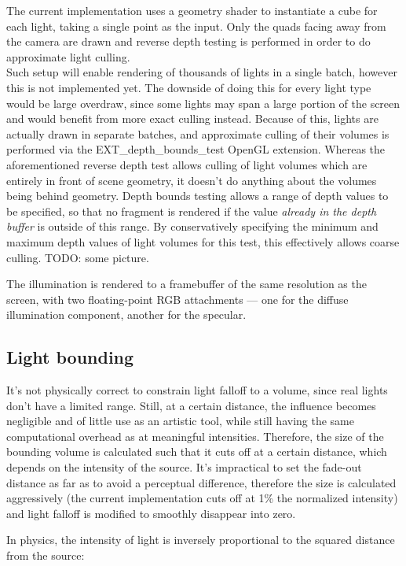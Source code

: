 The current implementation uses a geometry shader to instantiate a cube for each light, taking a single point as the input. Only the quads facing away from the camera are drawn and reverse depth testing is performed in order to do approximate light culling. \\
Such setup will enable rendering of thousands of lights in a single batch, however this is not implemented yet. The downside of doing this for every light type would be large overdraw, since some lights may span a large portion of the screen and would benefit from more exact culling instead. Because of this, lights are actually drawn in separate batches, and approximate culling of their volumes is performed via the EXT\_depth\_bounds\_test OpenGL extension. Whereas the aforementioned reverse depth test allows culling of light volumes which are entirely in front of scene geometry, it doesn't do anything about the volumes being behind geometry. Depth bounds testing allows a range of depth values to be specified, so that no fragment is rendered if the value \emph{already in the depth buffer} is outside of this range. By conservatively specifying the minimum and maximum depth values of light volumes for this test, this effectively allows coarse culling. TODO: some picture.

The illumination is rendered to a framebuffer of the same resolution as the screen, with two floating-point RGB attachments --- one for the diffuse illumination component, another for the specular.

\subsection{Light bounding}

It's not physically correct to constrain light falloff to a volume, since real lights don't have a limited range. Still, at a certain distance, the influence becomes negligible and of little use as an artistic tool, while still having the same computational overhead as at meaningful intensities. Therefore, the size of the bounding volume is calculated such that it cuts off at a certain distance, which depends on the intensity of the source. It's impractical to set the fade-out distance as far as to avoid a perceptual difference, therefore the size is calculated aggressively (the current implementation cuts off at 1\% the normalized intensity) and light falloff is modified to smoothly disappear into zero.

In physics, the intensity of light is inversely proportional to the squared distance from the source:
	
